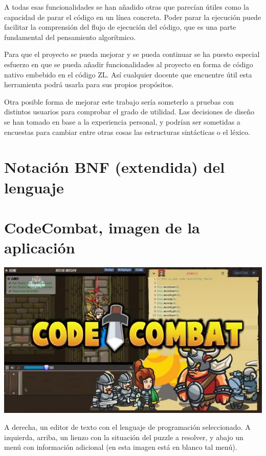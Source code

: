 \documentclass{report}
\begin{document}
	A todas esas funcionalidades se han añadido otras que parecían útiles como la capacidad de parar el código en un línea concreta. Poder parar la ejecución puede facilitar la comprensión del flujo de ejecución del código, que es una parte fundamental del pensamiento algorítmico. 
	
	Para que el proyecto se pueda mejorar y se pueda continuar se ha puesto especial esfuerzo en que se pueda añadir funcionalidades al proyecto en forma de código nativo embebido en el código ZL. Así cualquier docente que encuentre útil esta herramienta podrá usarla para sus propios propósitos. 
	
	Otra posible forma de mejorar este trabajo sería someterlo a pruebas con distintos usuarios para comprobar el grado de utilidad. Las decisiones de diseño se han tomado en base a la experiencia personal, y podrían ser sometidas a encuestas para cambiar entre otras cosas las estructuras sintácticas o el léxico. 
	 
	
	 
	
	

	\appendix
	\chapter{Notación BNF (extendida) del lenguaje} \label{app:a}
	
	
	\chapter{CodeCombat, imagen de la aplicación} \label{app:b}
	
	\begin{center}
	\includegraphics[width=1\linewidth]{codecombat}
	
	A derecha, un editor de texto con el lenguaje de programación seleccionado. A izquierda, arriba, un lienzo con la situación del puzzle a resolver, y abajo un menú con información adicional (en esta imagen está en blanco tal menú).
	\end{center}
	
\end{document}
